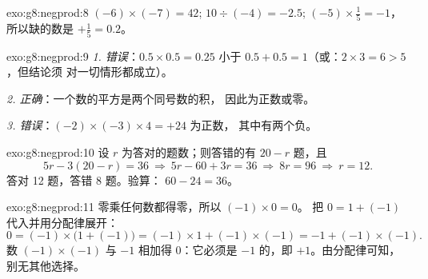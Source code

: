 \begin{solution}{exo:g8:negprod:8}
$(-6) \times (-7) = 42$; \quad
$10 \div (-4) = -2.5$; \quad
$(-5) \times \frac15 = -1$，所以缺的数是
$+\frac15 = 0.2$。
\end{solution}

\begin{solution}{exo:g8:negprod:9}
\emph{1. 错误}：$0.5 \times 0.5 = 0.25$ 小于
$0.5 + 0.5 = 1$（或：$2 \times 3 = 6 > 5$，但结论须
对一切情形都成立）。

\emph{2. 正确}：一个数的平方是两个同号数的积，
因此为正数或零。

\emph{3. 错误}：$(-2) \times (-3) \times 4 = +24$ 为正数，
其中有两个负。
\end{solution}

\begin{solution}{exo:g8:negprod:10}
设 $r$ 为答对的题数；则答错的有 $20 - r$ 题，且
\[
5r - 3(20 - r) = 36
\ \Longrightarrow\
5r - 60 + 3r = 36
\ \Longrightarrow\
8r = 96
\ \Longrightarrow\
r = 12 .
\]
答对 12 题，答错 8 题。验算：
$60 - 24 = 36$。
\end{solution}

\begin{solution}{exo:g8:negprod:11}
零乘任何数都得零，所以 $(-1) \times 0 = 0$。
把 $0 = 1 + (-1)$ 代入并用分配律展开：
\[
0 = (-1) \times \bigl(1 + (-1)\bigr)
= (-1) \times 1 + (-1) \times (-1)
= -1 + (-1) \times (-1).
\]
数 $(-1) \times (-1)$ 与 $-1$ 相加得 $0$：它必须是
$-1$ 的，即 $+1$。由分配律可知，
别无其他选择。
\end{solution}

